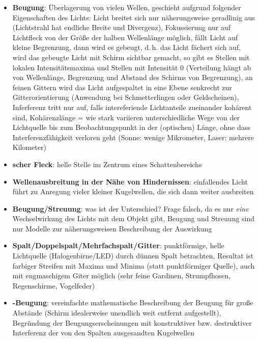 \linie
\pagebreak
\begin{itemize}
    \item
    \textbf{Beugung}:
    Überlagerung von vielen Wellen, geschieht aufgrund folgender Eigenschaften
    des Lichts:
    Licht breitet sich nur näherungsweise geradlinig aus
    (Lichtstrahl hat endliche Breite und Divergenz),
    Fokussierung nur auf Lichtfleck von der Größe der halben Wellenlänge
    möglich,
    fällt Licht auf kleine Begrenzung, dann wird es gebeugt, d.\,h.
    das Licht fächert sich auf,
    wird das gebeugte Licht mit Schirm sichtbar gemacht, so
    gibt es Stellen mit lokalen Intensitätsmaxima und Stellen mit
    Intensität $0$
    (Verteilung hängt ab von Wellenlänge, Begrenzung und Abstand des Schirms
    von Begrenzung),
    an feinen Gittern wird das Licht aufgespaltet in eine Ebene senkrecht
    zur Gitterorientierung (Anwendung bei Schmetterlingen oder Geldscheinen),
    Inferferenz tritt nur auf, falls intereferiende Lichtanteile zueinander
    kohärent sind,
    Kohärenzlänge = wie stark variieren unterschiedliche Wege
    von der Lichtquelle bis zum Beobachtungspunkt in der (optischen) Länge,
    ohne dass Interferenzfähigkeit verloren geht
    (Sonne: wenige Mikrometer, Laser: mehrere Kilometer)

    \item
    \textbf{scher Fleck}:
    helle Stelle im Zentrum eines Schattenbereichs

    \item
    \textbf{Wellenausbreitung in der Nähe von Hindernissen}:
    einfallendes Licht führt zu Anregung vieler kleiner Kugelwellen,
    die sich dann weiter ausbreiten

    \item
    \textbf{Beugung/Streuung}:
    was ist der Unterschied?
    Frage falsch, da es nur \emph{eine} Wechselwirkung des Lichts mit dem
    Objekt gibt, Beugung und Streuung sind nur Modelle zur
    näherungsweisen Beschreibung der Auswirkung
\end{itemize}
\linie
\begin{itemize}
    \item
    \textbf{Spalt/Doppelspalt/Mehrfachspalt/Gitter}:
    punktförmige, helle Lichtquelle (Halogenbirne/LED) durch
    dünnen Spalt betrachten,
    Resultat ist farbiger Streifen mit Maxima und Minima
    (statt punktförmiger Quelle), auch mit engmaschigem Giter möglich
    (sehr feine Gardinen, Strumpfhosen, Regenschirme, Vogelfeder)

    \item
    \textbf{-Beugung}:
    vereinfachte mathematische Beschreibung der Beugung für große Abstände
    (Schirm idealerweise unendlich weit entfernt aufgestellt),
    Begründung der Beugungserscheinungen mit konstruktiver bzw. destruktiver
    Interferenz der von den Spalten ausgesandten Kugelwellen
\end{itemize}
